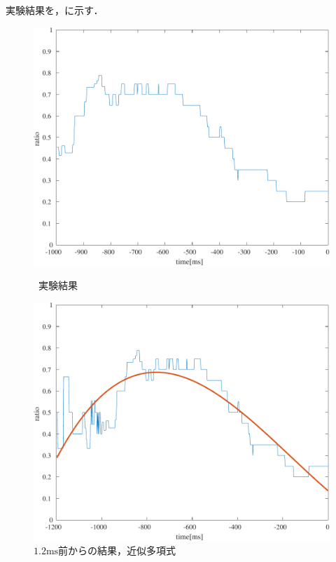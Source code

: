 \section{\result}
実験結果を，に示す．
\begin{figure}[H]
    \centering
    \begin{minipage}{.48\textwidth}
        \centering
        \includegraphics[keepaspectratio,width=\textwidth]{../../Figures/12_01_graph.pdf}
        \caption{\kadaia\ 実験結果}
        \label{fig:\kadaia 実験結果}
    \end{minipage}
    \begin{minipage}{.48\textwidth}
        \centering
        \includegraphics[keepaspectratio,width=\textwidth]{../../Figures/12_02_graph.pdf}
        \caption{\(1.2\textrm{ms}\)前からの結果，近似多項式}
        \label{fig:\kadaia 実験結果2}
    \end{minipage}
\end{figure}
